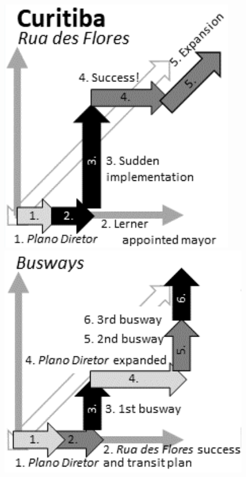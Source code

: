 \documentclass{tufte-handout}
\begin{document}
\begin{marginfigure}%
  \includegraphics[width=\linewidth]{Curitiba_1}
    \includegraphics[width=\linewidth]{Curitiba_2}

\end{marginfigure}
\end{document}
